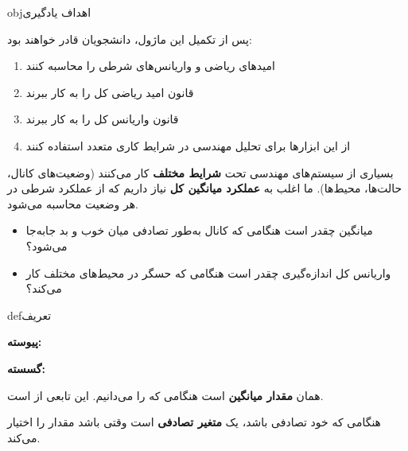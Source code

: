 \begin{PSbox}[unbreakable]{obj}{اهداف یادگیری}

پس از تکمیل این ماژول، دانشجویان قادر خواهند بود:

\begin{enumerate}
\def\labelenumi{\arabic{enumi}.}
\tightlist
\item
  امیدهای ریاضی و واریانس‌های شرطی را محاسبه کنند
\item
  قانون امید ریاضی کل را به کار ببرند
\item
  قانون واریانس کل را به کار ببرند
\item
  از این ابزارها برای تحلیل مهندسی در شرایط کاری متعدد استفاده کنند
\end{enumerate}

\end{PSbox}


بسیاری از سیستم‌های مهندسی تحت \textbf{شرایط مختلف} کار می‌کنند (وضعیت‌های کانال، حالت‌ها، محیط‌ها). ما اغلب به \textbf{عملکرد میانگین کل} نیاز داریم که از عملکرد شرطی در هر وضعیت محاسبه می‌شود.

\begin{itemize}
\tightlist
\item
  میانگین  چقدر است هنگامی که کانال به‌طور تصادفی میان خوب و بد جابه‌جا می‌شود؟
\item
  واریانس کل اندازه‌گیری چقدر است هنگامی که حسگر در محیط‌های مختلف کار می‌کند؟
\end{itemize}


\begin{PSbox}[unbreakable]{def}{تعریف}

\textbf{پیوسته:}

\textbf{گسسته:}

\end{PSbox}


 همان \textbf{مقدار میانگین } است هنگامی که  را می‌دانیم. این تابعی از  است.


هنگامی که خود  تصادفی باشد،  یک \textbf{متغیر تصادفی} است  وقتی  باشد مقدار  را اختیار می‌کند.

